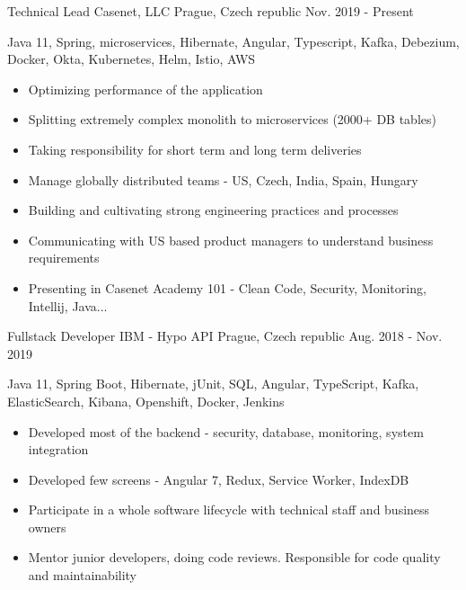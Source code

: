 

\begin{cventries}

  \cventry
    {Technical Lead} %
    {Casenet, LLC} %
    {Prague, Czech republic} %
    {Nov. 2019 - Present} %
    {
        \hspace{15pt} \faHammer Java 11, Spring, microservices, Hibernate, Angular, Typescript, Kafka, Debezium, Docker, Okta, Kubernetes, Helm, Istio, AWS
        \begin{itemize}
            \item {Optimizing performance of the application}
            \item {Splitting extremely complex monolith to microservices (2000+ DB tables)}
            \item {Taking responsibility for short term and long term deliveries}
            \item {Manage globally distributed teams - US, Czech, India, Spain, Hungary}
            \item {Building and cultivating strong engineering practices and processes}
            \item {Communicating with US based product managers to understand business requirements}
            \item {Presenting in Casenet Academy 101 - Clean Code, Security, Monitoring, Intellij, Java...}
        \end{itemize}
    }

  \cventry
    {Fullstack Developer} %
    {IBM - Hypo API} %
    {Prague,  Czech republic} %
    {Aug. 2018 - Nov. 2019} %
    {
        \hspace{15pt} \faHammer Java 11, Spring Boot, Hibernate, jUnit, SQL, Angular, TypeScript, Kafka, ElasticSearch, Kibana, Openshift, Docker, Jenkins
        \begin{itemize}
            \item {Developed most of the backend - security, database, monitoring, system integration}
            \item {Developed few screens - Angular 7, Redux, Service Worker, IndexDB}
            \item {Participate in a whole software lifecycle with technical staff and business owners}
            \item {Mentor junior developers, doing code reviews. Responsible for code quality and maintainability}
        \end{itemize}
    }


\end{cventries}

